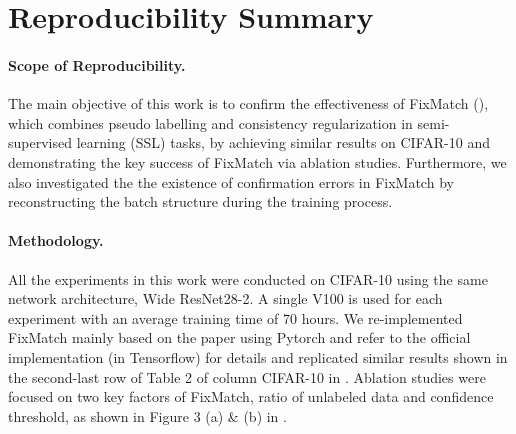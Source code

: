 \section*{\centering Reproducibility Summary}

\paragraph{Scope of Reproducibility.}


The main objective of this work is to confirm the effectiveness of FixMatch (\cite{sohn2020fixmatch}), which combines pseudo labelling and consistency regularization in semi-supervised learning (SSL) tasks, by achieving similar results on CIFAR-10 and demonstrating the key success of FixMatch via ablation studies. Furthermore, we also investigated the the existence of confirmation errors in FixMatch by reconstructing the batch structure during the training process.
\paragraph{Methodology.}

All the experiments in this work were conducted on CIFAR-10 using the same network architecture, Wide ResNet28-2. A single V100 is used for each experiment with an average training time of 70 hours. We re-implemented FixMatch mainly based on the paper using Pytorch and refer to the official implementation (in Tensorflow) for details and replicated similar results shown in the second-last row of Table 2 of column CIFAR-10 in \cite{sohn2020fixmatch}. Ablation studies were focused on two key factors of FixMatch, ratio of unlabeled data and confidence threshold, as shown in Figure 3 (a) \& (b) in \cite{sohn2020fixmatch}. 

